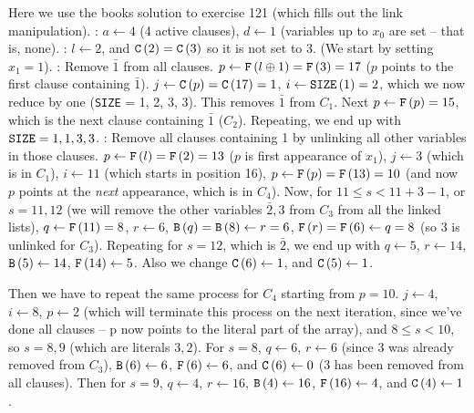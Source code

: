 Here we use the books solution to exercise 121 (which fills out the link
manipulation).
: $a \gets 4$ (4 active clauses), $d \gets 1$ (variables up to $x_0$ are set --
that is, none).
: $l \gets 2$, and ${\tt C}\left(2\right) = {\tt C}\left(3\right)$ so it is not
  set to 3. (We start by setting $x_1 = 1$).
: Remove $\bar 1$ from all clauses.  $p \gets {\tt F}\left(l \oplus 1\right) =
{\tt F}\left(3\right) = 17$ ($p$ points to the first clause containing $\bar 1$).
$j \gets {\tt C}\left(p\right) = {\tt C}\left(17\right) = 1$, $i \gets {\tt SIZE}
\left(1\right) = 2$, which we now reduce by one ({\tt SIZE} = 1, 2, 3, 3).
This removes $\bar 1$ from $C_1$.  Next $p \gets {\tt F}\left(p\right) = 15$,
which is the next clause containing $\bar 1$ ($C_2$).  Repeating, we end up
with ${\tt SIZE} = 1, 1, 3, 3$.
: Remove all clauses containing 1 by unlinking all other variables
in those clauses. $p \gets {\tt F}\left(l\right) = {\tt F}\left(2\right) = 13$ ($p$ is
first appearance of $x_1$), $j \gets 3$ (which is in $C_1$), $i \gets
11$ (which starts in position 16), $p \gets {\tt F}\left(p\right) = {\tt F}
\left(13\right) = 10$ (and now $p$
points at the {\it next} appearance, which is in $C_4$). 
Now, for
$11 \le s < 11 + 3 - 1$, or $s = 11, 12$ (we will remove the other variables
$\bar 2,3$ from $C_3$ from all the linked lists), $q \gets {\tt F}\left(11\right) = 8$,
$r \gets 6$, ${\tt B}\left(q\right) = {\tt B}\left(8\right) \gets r = 6$,
${\tt F}\left(r\right) = {\tt F}\left(6\right) \gets q = 8$ (so $3$ is unlinked
for $C_3$).  Repeating for $s = 12$, which is $\bar 2$, we end up
with $q \gets 5$, $r \gets 14$, ${\tt B}\left(5\right) \gets 14$, 
${\tt F}\left(14\right) \gets 5$.  Also we change ${\tt C}\left(6\right) \gets 1$,
and ${\tt C}\left(5\right) \gets 1$.     

Then we have to repeat the same process for $C_4$ starting from $p = 10$.
$j \gets 4$, $i \gets 8$, $p \gets 2$ (which will terminate this process on the
next iteration, since we've done all clauses -- p now points to the literal
part of the array), and $8 \le s < 10$, so $s = 8, 9$ (which are literals $3, 2$).
For $s=8$, $q \gets 6$, $r \gets 6$ (since 3 was already removed from $C_3$),
${\tt B}\left(6\right) \gets 6$, ${\tt F}\left(6\right) \gets 6$, and 
${\tt C}\left(6\right) \gets 0$ (3 has been removed from all clauses).
Then for $s=9$, $q \gets 4$, $r \gets 16$, ${\tt B}\left(4\right) \gets 16$,
${\tt F}\left(16\right) \gets 4$, and ${\tt C}\left(4\right) \gets 1$.

